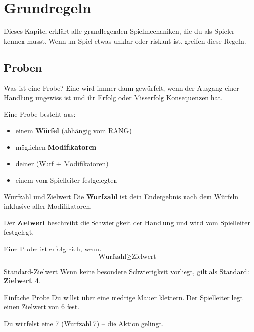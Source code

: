\chapter{Grundregeln}

Dieses Kapitel erklärt alle grundlegenden Spielmechaniken, die du als Spieler
kennen musst. Wenn im Spiel etwas unklar oder riskant ist, greifen diese Regeln.

\section{Proben}

\begin{rulebox}{Was ist eine Probe?}
	Eine  wird immer dann gewürfelt, wenn der Ausgang einer
	Handlung ungewiss ist und ihr Erfolg oder Misserfolg Konsequenzen hat.
\end{rulebox}

Eine Probe besteht aus:
\begin{itemize}
	\item einem \textbf{Würfel} (abhängig vom RANG)
	\item möglichen \textbf{Modifikatoren}
	\item deiner  (Wurf + Modifikatoren)
	\item einem vom Spielleiter festgelegten 
\end{itemize}

\begin{rulebox}{Wurfzahl und Zielwert}
	Die \textbf{Wurfzahl} ist dein Endergebnis nach dem Würfeln inklusive aller
	Modifikatoren.  
	
	Der \textbf{Zielwert} beschreibt die Schwierigkeit der Handlung und wird vom
	Spielleiter festgelegt.
\end{rulebox}

Eine Probe ist erfolgreich, wenn:
\[
\text{Wurfzahl} \ge \text{Zielwert}
\]

\begin{rulebox}{Standard-Zielwert}
	Wenn keine besondere Schwierigkeit vorliegt, gilt als Standard:
	\textbf{Zielwert 4}.
\end{rulebox}

\begin{examplebox}{Einfache Probe}
	Du willst über eine niedrige Mauer klettern.  
	Der Spielleiter legt einen Zielwert von 6 fest.  
	
	Du würfelst eine 7 (Wurfzahl 7) – die Aktion gelingt.
\end{examplebox}

